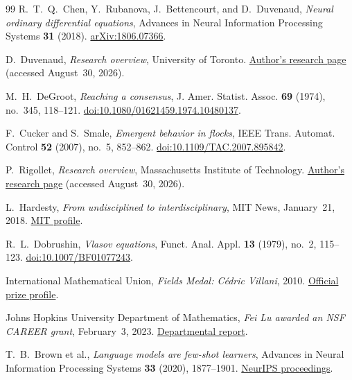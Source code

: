 \documentclass[11pt]{amsart}
\numberwithin{equation}{section}
\theoremstyle{plain}
\begin{document}
\begin{thebibliography}{99}
R.~T.~Q.~Chen, Y.~Rubanova, J.~Bettencourt, and D.~Duvenaud,
\emph{Neural ordinary differential equations},
Advances in Neural Information Processing Systems \textbf{31} (2018).
\href{https://arxiv.org/abs/1806.07366}{arXiv:1806.07366}.

D.~Duvenaud,
\emph{Research overview}, University of Toronto.
\href{https://www.cs.toronto.edu/~duvenaud/}{Author's research page}
(accessed August~30, 2026).

M.~H.~DeGroot,
\emph{Reaching a consensus},
J. Amer. Statist. Assoc. \textbf{69} (1974), no.~345, 118--121.
\href{https://doi.org/10.1080/01621459.1974.10480137}
{doi:10.1080/01621459.1974.10480137}.

F.~Cucker and S.~Smale,
\emph{Emergent behavior in flocks},
IEEE Trans. Automat. Control \textbf{52} (2007), no.~5, 852--862.
\href{https://doi.org/10.1109/TAC.2007.895842}
{doi:10.1109/TAC.2007.895842}.

P.~Rigollet,
\emph{Research overview}, Massachusetts Institute of Technology.
\href{https://math.mit.edu/~rigollet/index.html}{Author's research page}
(accessed August~30, 2026).

L.~Hardesty,
\emph{From undisciplined to interdisciplinary}, MIT News, January~21, 2018.
\href{https://news.mit.edu/2018/faculty-profile-philippe-rigollet-0122}
{MIT profile}.

R.~L.~Dobrushin,
\emph{Vlasov equations},
Funct. Anal. Appl. \textbf{13} (1979), no.~2, 115--123.
\href{https://doi.org/10.1007/BF01077243}
{doi:10.1007/BF01077243}.

International Mathematical Union,
\emph{Fields Medal: C\'edric Villani}, 2010.
\href{https://www.mathunion.org/fileadmin/IMU/ICM2010/offline/www.icm2010.in/prize-winners-2010/fields-medal-cedric-villani.html}
{Official prize profile}.

Johns Hopkins University Department of Mathematics,
\emph{Fei Lu awarded an NSF CAREER grant}, February~3, 2023.
\href{https://mathematics.jhu.edu/2023/02/03/fei-lu-awarded-an-nsf-career-grant/}
{Departmental report}.

T.~B.~Brown et al.,
\emph{Language models are few-shot learners},
Advances in Neural Information Processing Systems \textbf{33} (2020),
1877--1901.
\href{https://proceedings.neurips.cc/paper_files/paper/2020/hash/1457c0d6bfcb4967418bfb8ac142f64a-Abstract.html}
{NeurIPS proceedings}.


\end{thebibliography}
\end{document}
